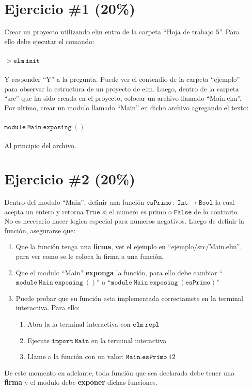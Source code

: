 \documentclass{article}
\begin{document}
\section*{Ejercicio \#1 (20\%)}
Crear un proyecto utilizando elm entro de la carpeta ``Hoja de trabajo 5''.
Para ello debe ejecutar el comando:\\\\
$>\mathtt{elm\ init}$\\\\
Y responder ``Y'' a la pregunta. Puede ver el contendio de la carpeta ``ejemplo''
para observar la estructura de un proyecto de elm. Luego, dentro de la carpeta
``src'' que ha sido creada en el proyecto, colocar un archivo llamado ``Main.elm''.
Por ultimo, crear un modulo llamado ``Main'' en dicho archivo agregando el texto:\\\\
$\mathtt{module\ Main\ exposing\ ()}$\\\\
Al principio del archivo.

\section*{Ejercicio \#2 (20\%)}
Dentro del modulo ``Main'', definir una funci\'on $\mathtt{esPrimo}\ :\ 
\mathtt{Int}\rightarrow\mathtt{Bool}$ la cual acepta un entero y retorna
$\mathtt{True}$ si el numero es primo o $\mathtt{False}$ de lo contrario.
No es necesario hacer logica especial para numeros negativos.
Luego de definir la funci\'on, asegurarse que:
\begin{enumerate}
        \item{Que la funci\'on tenga una {\bf firma}, ver el ejemplo
        en ``ejemplo/src/Main.elm'', para ver como se le coloca la
        firma a una funci\'on.}
        \item{Que el modulo ``Main'' {\bf exponga} la funci\'on, para ello
        debe cambiar ``$\mathtt{module\ Main\ exposing\ ()}$'' a
        ``$\mathtt{module\ Main\ exposing\ (esPrimo)}$''}
        \item{Puede probar que su funci\'on esta implementada correctamete
        en la terminal interactiva. Para ello:
        \begin{enumerate}
                \item{Abra la la terminal interactiva con $\mathtt{elm\ repl}$}
                \item{Ejecute $\mathtt{import\ Main}$ en la terminal interactiva}
                \item{Llame a la funci\'on con un valor: $\mathtt{Main.esPrimo}\ 42$}
        \end{enumerate}
        }
\end{enumerate}
De este momento en adelante, toda funci\'on que sea declarada debe tener
una {\bf firma} y el modulo debe {\bf exponer} dichas funciones.
\end{document}
